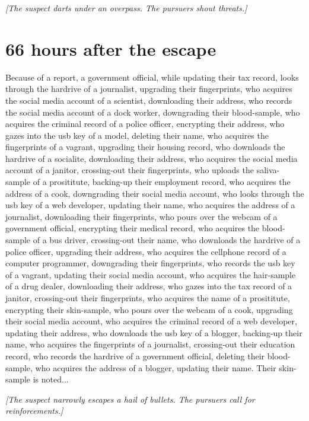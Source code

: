 \documentclass{report}
\begin{document}
\textit{[The suspect darts under an overpass. The pursuers shout threats.]}


\section*{66 \small{hours after the escape}}

Because of a report, a government official, while updating their tax record, looks through the hardrive of a journalist, upgrading their fingerprints, who acquires the social media account of a scientist, downloading their address, who records the social media account of a dock worker, downgrading their blood-sample, who acquires the criminal record of a police officer, encrypting their address, who gazes into the usb key of a model, deleting their name, who acquires the fingerprints of a vagrant, upgrading their housing record, who downloads the hardrive of a socialite, downloading their address, who acquires the social media account of a janitor, crossing-out their fingerprints, who uploads the saliva-sample of a prosititute, backing-up their employment record, who acquires the address of a cook, downgrading their social media account, who looks through the usb key of a web developer, updating their name, who acquires the address of a journalist, downloading their fingerprints, who pours over the webcam of a government official, encrypting their medical record, who acquires the blood-sample of a bus driver, crossing-out their name, who downloads the hardrive of a police officer, upgrading their address, who acquires the cellphone record of a computer programmer, downgrading their fingerprints, who records the usb key of a vagrant, updating their social media account, who acquires the hair-sample of a drug dealer, downloading their address, who gazes into the tax record of a janitor, crossing-out their fingerprints, who acquires the name of a prosititute, encrypting their skin-sample, who pours over the webcam of a cook, upgrading their social media account, who acquires the criminal record of a web developer, updating their address, who downloads the usb key of a blogger, backing-up their name, who acquires the fingerprints of a journalist, crossing-out their education record, who records the hardrive of a government official, deleting their blood-sample, who acquires the address of a blogger, updating their name. Their skin-sample is noted...

\textit{[The suspect narrowly escapes a hail of bullets. The pursuers call for reinforcements.]}
\end{document}
